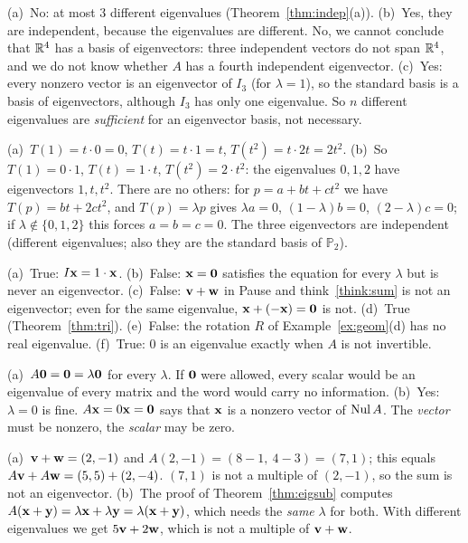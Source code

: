 \documentclass[11pt]{article}
\begin{document}
\begin{description}[leftmargin=0pt,itemsep=5pt]
  \item[Knowledge Check \ref{kc:count}.] (a)~No: at most $3$ different eigenvalues (Theorem~\ref{thm:indep}(a)). (b)~Yes, they are independent, because the eigenvalues are different. No, we cannot conclude that $\mathbb{R}^4$ has a basis of eigenvectors: three independent vectors do not span $\mathbb{R}^4$, and we do not know whether $A$ has a fourth independent eigenvector. (c)~Yes: every nonzero vector is an eigenvector of $I_3$ (for $\lambda=1$), so the standard basis is a basis of eigenvectors, although $I_3$ has only one eigenvalue. So $n$ different eigenvalues are \emph{sufficient} for an eigenvector basis, not necessary.
  \item[Knowledge Check \ref{kc:func}.] (a)~$T(1)=t\cdot0=0$, $T(t)=t\cdot1=t$, $T(t^2)=t\cdot2t=2t^2$. (b)~So $T(1)=0\cdot1$, $T(t)=1\cdot t$, $T(t^2)=2\cdot t^2$: the eigenvalues $0,1,2$ have eigenvectors $1,t,t^2$. There are no others: for $p=a+bt+ct^2$ we have $T(p)=bt+2ct^2$, and $T(p)=\lambda p$ gives $\lambda a=0$, $(1-\lambda)b=0$, $(2-\lambda)c=0$; if $\lambda\notin\{0,1,2\}$ this forces $a=b=c=0$. The three eigenvectors are independent (different eigenvalues; also they are the standard basis of $\mathbb{P}_2$).
  \item[Knowledge Check \ref{kc:tf}.] (a)~True: $I\mathbf{x}=1\cdot\mathbf{x}$. (b)~False: $\mathbf{x}=\mathbf{0}$ satisfies the equation for every $\lambda$ but is never an eigenvector. (c)~False: $\mathbf{v}+\mathbf{w}$ in Pause and think~\ref{think:sum} is not an eigenvector; even for the same eigenvalue, $\mathbf{x}+(-\mathbf{x})=\mathbf{0}$ is not. (d)~True (Theorem~\ref{thm:tri}). (e)~False: the rotation $R$ of Example~\ref{ex:geom}(d) has no real eigenvalue. (f)~True: $0$ is an eigenvalue exactly when $A$ is not invertible.
  \item[Pause and think \ref{think:nonzero}.] (a)~$A\mathbf{0}=\mathbf{0}=\lambda\mathbf{0}$ for every $\lambda$. If $\mathbf{0}$ were allowed, every scalar would be an eigenvalue of every matrix and the word would carry no information. (b)~Yes: $\lambda=0$ is fine. $A\mathbf{x}=0\mathbf{x}=\mathbf{0}$ says that $\mathbf{x}$ is a nonzero vector of $\operatorname{Nul} A$. The \emph{vector} must be nonzero, the \emph{scalar} may be zero.
  \item[Pause and think \ref{think:sum}.] (a)~$\mathbf{v}+\mathbf{w}=(2,-1)$ and $A(2,-1)=(8-1,\ 4-3)=(7,1)$; this equals $A\mathbf{v}+A\mathbf{w}=(5,5)+(2,-4)$. $(7,1)$ is not a multiple of $(2,-1)$, so the sum is not an eigenvector. (b)~The proof of Theorem~\ref{thm:eigsub} computes $A(\mathbf{x}+\mathbf{y})=\lambda\mathbf{x}+\lambda\mathbf{y}=\lambda(\mathbf{x}+\mathbf{y})$, which needs the \emph{same} $\lambda$ for both. With different eigenvalues we get $5\mathbf{v}+2\mathbf{w}$, which is not a multiple of $\mathbf{v}+\mathbf{w}$.

\end{description}
\end{document}
